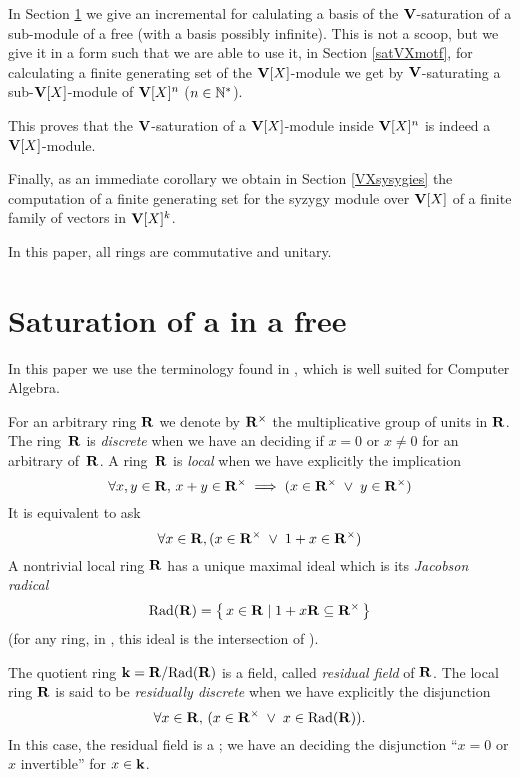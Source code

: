 In Section \ref{satVmotf} we give an incremental \algo for calulating a basis of the $\mathbf{V}$-saturation of a
\tf sub-module of a free \Vmo (with a basis possibly infinite).
This \algo is not a scoop, but we give it in a form such that we are able to
use it, in Section \ref{satVXmotf}, for calculating a finite generating set of the $\mathbf{V}[X]$-module we get by  $\mathbf{V}$-saturating a \tf sub-$\mathbf{V}[X]$-module of
 $\mathbf{V}[X]^n$ ($n\in \mathbb{N}^*$).

This proves that the $\mathbf{V}$-saturation of a \tf $\mathbf{V}[X]$-module inside
 $\mathbf{V}[X]^n$ is indeed a \tf $\mathbf{V}[X]$-module.

Finally, as an immediate corollary we obtain in
Section \ref{VXsysygies} the computation of a finite generating set for the syzygy module over $\mathbf{V}[X]$ of a finite family of vectors in $\mathbf{V}[X]^k$.



\medskip
In this paper, all rings are commutative and unitary.




\section{Saturation of a \tf \Vmo in a free \Vmo} \label{satVmotf}

In this paper we use the \cov terminology found in
 \citealt*{MRR}, which is well suited for Computer Algebra.


\smallskip For an arbitrary ring $\mathbf{R}$ we denote by $\mathbf{R}^\times$ the multiplicative group of units in $\mathbf{R}$.
The ring~$\mathbf{R}$ is \textsl{discrete} when we have an \algo deciding if  $x=0$ or $x\neq 0$ for an arbitrary \elt of~$\mathbf{R}$.
A ring~$\mathbf{R}$ is \textsl{local} when we have explicitly the implication
\[
\forall x,y\in\mathbf{R},\,x+y\in\mathbf{R}^\times\; \Longrightarrow\;(x \in\mathbf{R}^\times\;\vee \;y\in\mathbf{R}^\times)
\]
It is equivalent to ask
$$
\forall x\in\mathbf{R},(x \in\mathbf{R}^\times\;\vee \;1+x\in\mathbf{R}^\times)
$$
A nontrivial local ring $\mathbf{R}$ has a unique maximal ideal which is its \textsl{Jacobson radical}
\[\mathrm{Rad}(\mathbf{R})=\left\{{\,x\in\mathbf{R}\mid1+x\mathbf{R}\subseteq \mathbf{R}^\times\,}\right\}
\]
(for any ring, in \clama, this ideal is the intersection of \idemas).

The quotient ring $\mathbf{k}=\mathbf{R}/\mathrm{Rad}(\mathbf{R})$ is a field, called \textsl{residual field} of $\mathbf{R}$.
The local ring $\mathbf{R}$ is said to be  \textsl{residually discrete} when we have explicitly the disjunction
\[\forall x\in\mathbf{R},\,(x\in\mathbf{R}^\times\;\vee\;x\in\mathrm{Rad}(\mathbf{R})) .
\] 
In this case, the residual field is a \cdi; we have an \algo deciding the disjunction
``$x=0$ or $x$ invertible'' for $x\in\mathbf{k}$.



